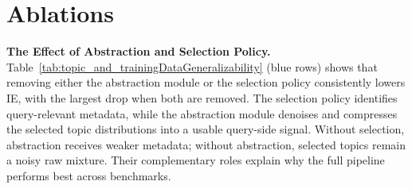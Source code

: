 \section{Ablations}
\label{sec:ablations}

\noindent
\textbf{The Effect of Abstraction and Selection Policy. }
Table~\ref{tab:topic_and_trainingDataGeneralizability} (\colorbox{cyan!15}{blue rows}) shows that removing either the abstraction module or the selection policy consistently lowers IE, with the largest drop when both are removed. The selection policy identifies query-relevant metadata, while the abstraction module denoises and compresses the selected topic distributions into a usable query-side signal. Without selection, abstraction receives weaker metadata; without abstraction, selected topics remain a noisy raw mixture. Their complementary roles explain why the full \name{} pipeline performs best across benchmarks.


